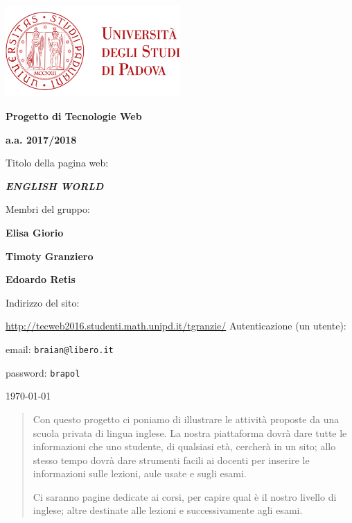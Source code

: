 \documentclass[12pt, a4paper]{article}
\begin{document}
\frenchspacing
\begin{titlepage}
	\centering
	\includegraphics[width=0.50\textwidth]{img/logo_unipd_color.png}\par\vspace{1cm} %
	
	{\LARGE\bfseries Progetto di Tecnologie Web \par}
	\vspace{1cm}
	
	{\Large\bfseries a.a. 2017/2018 \par}
	\vspace{1.5cm}
	
	{\Large Titolo della pagina web: \par}
	\vspace{0.5cm}
	
	{\LARGE\bfseries\itshape ENGLISH WORLD \par}
	
	\vfill 

	Membri del gruppo: \par
	{\bfseries Elisa Giorio \par}
	{\bfseries Timoty Granziero \par}
	{\bfseries Edoardo Retis \par}
	
	\vfill

	Indirizzo del sito: \par
	\url{http://tecweb2016.studenti.math.unipd.it/tgranzie/}
	\vfill
	Autenticazione (un utente):\par
	email: \texttt{braian@libero.it}\par
	password: \texttt{brapol}
	\vfill
	
	{\large \today\par}
	
\end{titlepage}

\tableofcontents 
\pagebreak

\begin{abstract}
Con questo progetto ci poniamo di illustrare le attività proposte da una scuola privata di lingua inglese. La nostra piattaforma dovrà dare tutte le informazioni che uno studente, di qualsiasi età, cercherà in un sito; allo stesso tempo dovrà dare strumenti facili ai docenti per inserire le informazioni sulle lezioni, aule usate e sugli esami.\par
Ci saranno pagine dedicate ai corsi, per capire qual è il nostro livello di inglese; altre destinate alle lezioni e successivamente agli esami.
\end{abstract}
\end{document}
